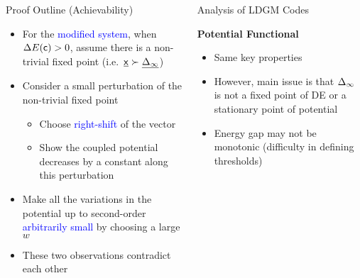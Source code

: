 \documentclass{beamer}
\newlength{\twocolwid}
\newlength{\threecolwid}
\begin{document}
\begin{columns}[t]
\begin{column}{\twocolwid}
    \vspace{2cm}
    \begin{block}{Proof Outline (Achievability)}
      \begin{itemize}
        \vspace{0.4cm}
      \item For the \textcolor{blue}{modified system}, when $\Delta E(\mathsf{c})>0$, assume there is a non-trivial fixed point (i.e.~$\underline{\mathsf{x}} \succ \underline{\Delta_{\infty}}$)
        \vspace{0.4cm}
      \item\vspace{0.75cm} Consider a small perturbation of the non-trivial fixed point
        \begin{itemize}
        \item\vspace{0.75cm} Choose \textcolor{blue}{right-shift} of the vector
        \item\vspace{0.75cm} Show the coupled potential \alert{decreases by a constant} along this perturbation
        \end{itemize}
      \item\vspace{0.75cm} Make all the variations in the potential up to second-order \textcolor{blue}{arbitrarily small} by choosing a \alert{large $w$}
      \item\vspace{0.75cm} These two observations \alert{contradict} each other
      \end{itemize}
    \end{block}
  \end{column}

  \begin{column}{\threecolwid}

    \vspace{2cm}
    \begin{block}{Analysis of LDGM Codes}
      \vspace{0.75cm}
      \setlength\tikzheight{14.5cm}
      \setlength\tikzwidth{19cm}
      

      \vspace{1.25cm}
      \textcolor{jblue}{\bf Potential Functional}

      \begin{itemize}
      \item\vspace{0.75cm} Same key properties
      \item\vspace{0.75cm} However, main issue is that $\Delta_\infty$ is not a fixed point of DE or a stationary point of potential
      \item\vspace{0.75cm} Energy gap \alert{may not} be monotonic (difficulty in defining thresholds)
      \end{itemize}


\end{block}
\end{column}
\end{columns}
\end{document}
